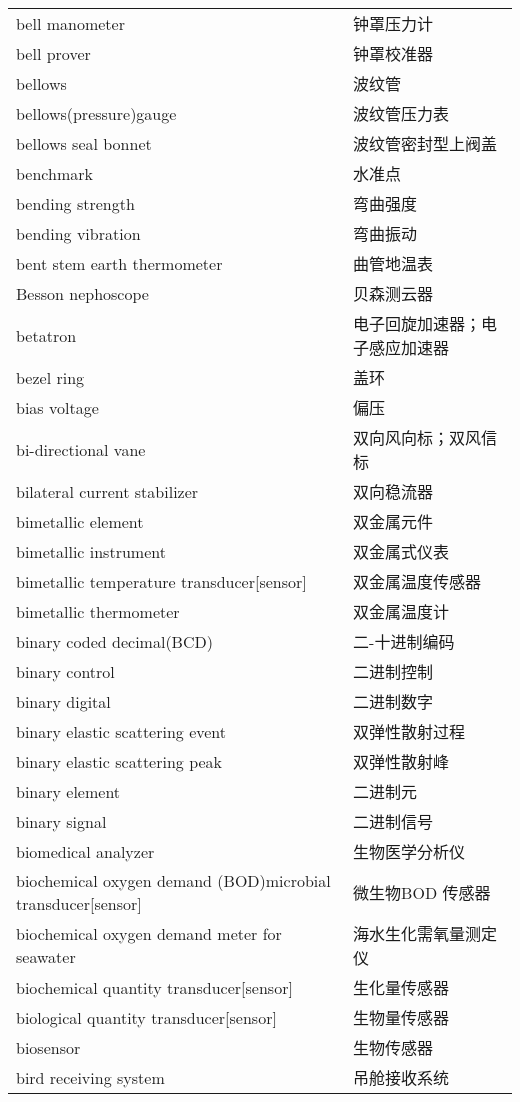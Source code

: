 \documentclass[
]{article}
\begin{document}
\begin{longtable}[]{@{}ll@{}}
bell manometer & 钟罩压力计 \\
bell prover & 钟罩校准器 \\
bellows & 波纹管 \\
bellows(pressure)gauge & 波纹管压力表 \\
bellows seal bonnet & 波纹管密封型上阀盖 \\
benchmark & 水准点 \\
bending strength & 弯曲强度 \\
bending vibration & 弯曲振动 \\
bent stem earth thermometer & 曲管地温表 \\
Besson nephoscope & 贝森测云器 \\
betatron & 电子回旋加速器；电子感应加速器 \\
bezel ring & 盖环 \\
bias voltage & 偏压 \\
bi-directional vane & 双向风向标；双风信标 \\
bilateral current stabilizer & 双向稳流器 \\
bimetallic element & 双金属元件 \\
bimetallic instrument & 双金属式仪表 \\
bimetallic temperature transducer{[}sensor{]} & 双金属温度传感器 \\
bimetallic thermometer & 双金属温度计 \\
binary coded decimal(BCD) & 二-十进制编码 \\
binary control & 二进制控制 \\
binary digital & 二进制数字 \\
binary elastic scattering event & 双弹性散射过程 \\
binary elastic scattering peak & 双弹性散射峰 \\
binary element & 二进制元 \\
binary signal & 二进制信号 \\
biomedical analyzer & 生物医学分析仪 \\
biochemical oxygen demand (BOD)microbial transducer{[}sensor{]} &
微生物BOD 传感器 \\
biochemical oxygen demand meter for seawater & 海水生化需氧量测定 仪 \\
biochemical quantity transducer{[}sensor{]} & 生化量传感器 \\
biological quantity transducer{[}sensor{]} & 生物量传感器 \\
biosensor & 生物传感器 \\
bird receiving system & 吊舱接收系统 \\

\end{longtable}
\end{document}
